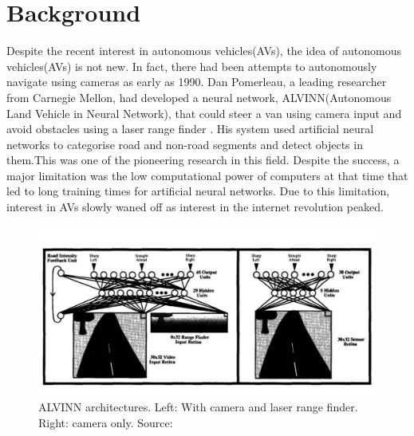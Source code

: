 \let\textcircled=\pgftextcircled


\chapter{Background}
\label{chap:background}

Despite the recent interest in autonomous vehicles(AVs), the idea of autonomous vehicles(AVs) is not new. In fact, there had been attempts to autonomously navigate using cameras as early as 1990. Dan Pomerleau, a leading researcher from Carnegie Mellon, had developed a neural network, ALVINN(Autonomous Land Vehicle in Neural Network)\cite{pomerleau1989alvinn},  that could steer a van using camera input and avoid obstacles using a laser range finder . His system used artificial neural networks to categorise road and non-road segments and detect objects in them\cite{pomerleau1991rapidly}.This was one of the pioneering research in this field. Despite the success, a major limitation was the low computational power of computers at that time that led to long training times for artificial neural networks. Due to this limitation, interest in AVs slowly waned off as interest in the internet revolution peaked. 

 \begin{figure}[h]
	\centering
	\includegraphics[width=\textwidth]{images/alvinn.png}
	\caption{ALVINN architectures. Left: With camera and laser range finder. Right: camera only. Source: \cite{pomerleau1991rapidly}}
	\label{fig:alvinn}
\end{figure}

